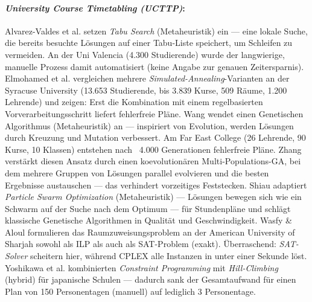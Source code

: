\paragraph{\textit{University Course Timetabling (UCTTP)}:}
Alvarez-Valdes et al. \cite{v-alvarez2002design} setzen \textit{Tabu Search} (Metaheuristik) ein --- eine lokale Suche, die bereits besuchte Lösungen auf einer Tabu-Liste speichert, um Schleifen zu vermeiden. An der Uni Valencia (4.300 Studierende) wurde der langwierige, manuelle Prozess damit automatisiert (keine Angabe zur genauen Zeitersparnis). Elmohamed et al. \cite{v-elmohamed1997comparison} vergleichen mehrere \textit{Simulated-Annealing}-Varianten an der Syracuse University (13.653 Studierende, bis 3.839 Kurse, 509 Räume, 1.200 Lehrende) und zeigen: Erst die Kombination mit einem regelbasierten Vorverarbeitungsschritt liefert fehlerfreie Pläne.
Wang \cite{v-wang2003using} wendet einen Genetischen Algorithmus (Metaheuristik) an --- inspiriert von Evolution, werden Lösungen durch Kreuzung und Mutation verbessert. Am Far East College (26 Lehrende, 90 Kurse, 10 Klassen) entstehen nach ~4.000 Generationen fehlerfreie Pläne. Zhang \cite{v-zhang2022optimized} verstärkt diesen Ansatz durch einen koevolutionären Multi-Populations-GA, bei dem mehrere Gruppen von Lösungen parallel evolvieren und die besten Ergebnisse austauschen --- das verhindert vorzeitiges Feststecken. Shiau \cite{v-shiau2011hybrid} adaptiert \textit{Particle Swarm Optimization} (Metaheuristik) --- Lösungen bewegen sich wie ein Schwarm auf der Suche nach dem Optimum --- für Stundenpläne und schlägt klassische Genetische Algorithmen in Qualität und Geschwindigkeit.
Wasfy \& Aloul \cite{v-wasfy2007solving} formulieren das Raumzuweisungsproblem an der American University of Sharjah sowohl als ILP als auch als SAT-Problem (exakt). Überraschend: \textit{SAT-Solver} scheitern hier, während CPLEX alle Instanzen in unter einer Sekunde löst. Yoshikawa et al. \cite{v-yoshikawa1996constraint} kombinierten \textit{Constraint Programming} mit \textit{Hill-Climbing} (hybrid) für japanische Schulen --- dadurch sank der Gesamtaufwand für einen Plan von 150 Personentagen (manuell) auf lediglich 3 Personentage.

